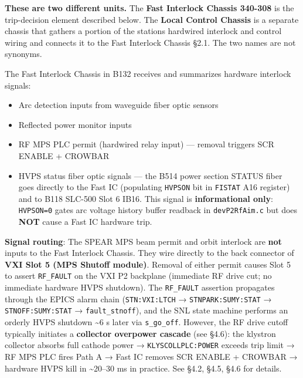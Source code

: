 \begin{keynote}
\textbf{These are two different units.} The \textbf{Fast Interlock Chassis 340-308} is the trip-decision element described below. The \textbf{Local Control Chassis} is a separate chassis that gathers a portion of the station\textquotesingle s hardwired interlock and control wiring and connects it to the Fast Interlock Chassis  §2.1. The two names are not synonyms.
\end{keynote}

The Fast Interlock Chassis in B132 receives and summarizes hardware interlock signals:

\begin{itemize}
\tightlist
\item
  Arc detection inputs from waveguide fiber optic sensors
\item
  Reflected power monitor inputs
\item
  RF MPS PLC permit (hardwired relay input) --- removal triggers SCR ENABLE + CROWBAR
\item
  HVPS status fiber optic signals --- the B514 power section STATUS fiber goes directly to the Fast IC (populating \texttt{HVPSON} bit in \texttt{FISTAT} A16 register) and to B118 SLC-500 Slot 6 IB16. This signal is \textbf{informational only}: \texttt{HVPSON=0} gates arc voltage history buffer readback in \texttt{devP2RfAim.c} but does \textbf{NOT} cause a Fast IC hardware trip.
\end{itemize}

\begin{keynote}
\textbf{Signal routing}: The SPEAR MPS beam permit and orbit interlock are \textbf{not} inputs to the Fast Interlock Chassis. They wire directly to the back connector of \textbf{VXI Slot 5 (MPS Shutoff module)}. Removal of either permit causes Slot 5 to assert \texttt{RF\_FAULT} on the VXI P2 backplane (immediate RF drive cut; no immediate hardware HVPS shutdown). The \texttt{RF\_FAULT} assertion propagates through the EPICS alarm chain (\texttt{STN:VXI:LTCH} → \texttt{STNPARK:SUMY:STAT} → \texttt{STNOFF:SUMY:STAT} → \texttt{fault\_stnoff}), and the SNL state machine performs an orderly HVPS shutdown \textasciitilde6 s later via \texttt{s\_go\_off}. However, the RF drive cutoff typically initiates a \textbf{collector overpower cascade} (see  §4.6): the klystron collector absorbs full cathode power → \texttt{KLYSCOLLPLC:POWER} exceeds trip limit → RF MPS PLC fires Path A → Fast IC removes SCR ENABLE + CROWBAR → hardware HVPS kill in \textasciitilde20--30 ms in practice. See  §4.2, §4.5, §4.6 for details.
\end{keynote}

